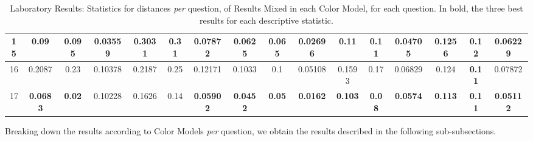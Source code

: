 \begin{table}[htbp]
{\begin{tabular}{@{}cccccccccccccccc@{}}
    \multicolumn{1}{|c|}{15}     & \multicolumn{1}{c|}{0.09}            & \multicolumn{1}{c|}{0.095}          & \multicolumn{1}{c||}{\textbf{0.03559}} & \multicolumn{1}{c|}{0.3031}          & \multicolumn{1}{c|}{0.31}           & \multicolumn{1}{c||}{0.07872}          & \multicolumn{1}{c|}{\textbf{0.0625}} & \multicolumn{1}{c|}{0.065}         & \multicolumn{1}{c||}{\textbf{0.02696}} & \multicolumn{1}{c||}{0.11}            & \multicolumn{1}{c|}{0.11}           & \multicolumn{1}{c|}{\textbf{0.04705}} & \multicolumn{1}{c|}{0.1256}          & \multicolumn{1}{c|}{0.12}          & \multicolumn{1}{c|}{0.06229}          \\ \midrule
    \multicolumn{1}{|c|}{16}     & \multicolumn{1}{c|}{0.2087}          & \multicolumn{1}{c|}{0.23}           & \multicolumn{1}{c||}{0.10378}          & \multicolumn{1}{c|}{0.2187}          & \multicolumn{1}{c|}{0.25}           & \multicolumn{1}{c||}{0.12171}          & \multicolumn{1}{c|}{0.1033}          & \multicolumn{1}{c|}{0.1}           & \multicolumn{1}{c||}{0.05108}          & \multicolumn{1}{c||}{0.1593}          & \multicolumn{1}{c|}{0.17}           & \multicolumn{1}{c|}{0.06829}          & \multicolumn{1}{c|}{0.124}           & \multicolumn{1}{c|}{\textbf{0.11}} & \multicolumn{1}{c|}{0.07872}          \\ \midrule
    \multicolumn{1}{|c|}{17}     & \multicolumn{1}{c|}{\textbf{0.0683}} & \multicolumn{1}{c|}{\textbf{0.02}}  & \multicolumn{1}{c||}{0.10228}          & \multicolumn{1}{c|}{0.1626}          & \multicolumn{1}{c|}{0.14}           & \multicolumn{1}{c||}{\textbf{0.05902}} & \multicolumn{1}{c|}{\textbf{0.0452}} & \multicolumn{1}{c|}{\textbf{0.05}} & \multicolumn{1}{c||}{\textbf{0.0162}}  & \multicolumn{1}{c||}{\textbf{0.103}}  & \multicolumn{1}{c|}{\textbf{0.08}}  & \multicolumn{1}{c|}{\textbf{0.0574}}  & \multicolumn{1}{c|}{\textbf{0.113}}  & \multicolumn{1}{c|}{\textbf{0.11}} & \multicolumn{1}{c|}{\textbf{0.05112}} \\ \bottomrule
    \end{tabular}}
  \caption[Laboratory Results: Statistics for distances \emph{per} question, of Results Mixed in each Color Model]{Laboratory Results: Statistics for distances \emph{per} question, of Results Mixed in each Color Model, for each question. In bold, the three best results for each descriptive statistic.}
  \label{table:colormodels_distances_questions_statistics}
\end{table}
%
Breaking down the results according to Color Models \emph{per} question, we obtain the results described in the following sub-subsections. \par
%

